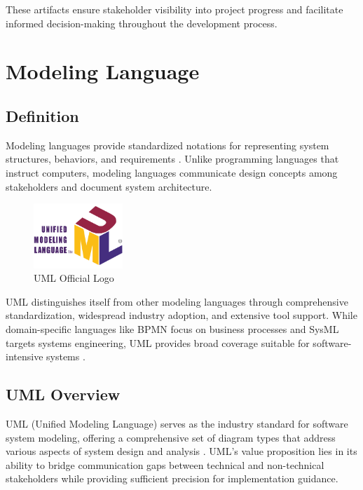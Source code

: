 These artifacts ensure stakeholder visibility into project progress and facilitate informed decision-making throughout the development process.

\section{Modeling Language}

\subsection{Definition}

Modeling languages provide standardized notations for representing system structures, behaviors, and requirements \cite{modeling_languages}. Unlike programming languages that instruct computers, modeling languages communicate design concepts among stakeholders and document system architecture.

\begin{figure}[htbp]
\centering
\includegraphics[width=0.3\textwidth]{pictures/web/UML_logo.svg.png}
\caption{UML Official Logo}
\label{fig:uml_logo}
\end{figure}

UML distinguishes itself from other modeling languages through comprehensive standardization, widespread industry adoption, and extensive tool support. While domain-specific languages like BPMN focus on business processes and SysML targets systems engineering, UML provides broad coverage suitable for software-intensive systems \cite{uml_comparison}.

\subsection{UML Overview}

UML (Unified Modeling Language) serves as the industry standard for software system modeling, offering a comprehensive set of diagram types that address various aspects of system design and analysis \cite{uml_specification}. UML's value proposition lies in its ability to bridge communication gaps between technical and non-technical stakeholders while providing sufficient precision for implementation guidance.

